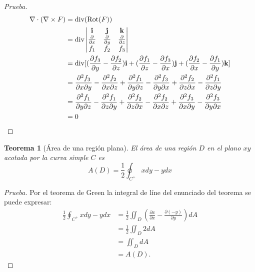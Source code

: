 \documentclass[11pt]{book}
\newcounter{Teorema}
\numberwithin{equation}{section}
\theoremstyle{plain}  %
\newtheorem{thm}{Teorema}[section]
\begin{document}
\begin{proof}[Prueba]
\begin{align*}
\nabla\cdot(\nabla\times F)&=\mathrm{div}(\mathrm{Rot}(F))\\
&=\mathrm{div}\left|\begin{matrix}
	{\bf i}&{\bf j}&{\bf k}\\
	\frac{\partial}{\partial x}&\frac{\partial}{\partial y}&\frac{\partial}{\partial z}\\
	f_1&f_2&f_3
\end{matrix}\right|\\
&=\mathrm{div}[(\frac{\partial f_3}{\partial y}-\frac{\partial f_2}{\partial z}){\bf i}+(\frac{\partial f_1}{\partial z}-\frac{\partial f_3}{\partial x}){\bf j}+(\frac{\partial f_2}{\partial x}-\frac{\partial f_1}{\partial y}){\bf k}]\\
&=\frac{\partial^{2} f_3}{\partial x\partial y}-\frac{\partial^{2} f_2}{\partial x\partial z}+\frac{\partial^{2} f_1}{\partial y\partial z}-\frac{\partial^{2} f_3}{\partial y\partial x}+\frac{\partial^{2} f_2}{\partial z\partial x}-\frac{\partial^{2} f_1}{\partial z\partial y}\\
&=\frac{\partial^{2} f_1}{\partial y\partial z}-\frac{\partial^{2} f_1}{\partial z\partial y}+\frac{\partial^{2} f_2}{\partial z\partial x}-\frac{\partial^{2} f_2}{\partial x\partial z}+\frac{\partial^{2} f_3}{\partial x\partial y}-\frac{\partial^{2} f_3}{\partial y\partial x}\\
&=0
\end{align*}
\end{proof}
\begin{thm}[Área de una región plana] El área de una región $D$ en el plano $xy$ acotada por la curva simple $C$ es 
	$$A(D)=\frac{1}{2}\oint_{C^{+}}xdy-ydx$$
\end{thm}
\begin{proof}[Prueba] Por el teorema de Green la integral de líne del enunciado del teorema se puede expresar:
\begin{align*}
\frac{1}{2}\oint_{C^{+}}xdy-ydx&=\frac{1}{2}\iint_D\left(\frac{\partial x}{\partial x}-\frac{\partial(-y)}{\partial y}\right)dA\\
&=\frac{1}{2}\iint_D2dA\\
&=\iint_DdA\\
&=A(D).
\end{align*}

\end{proof}
\end{document}

